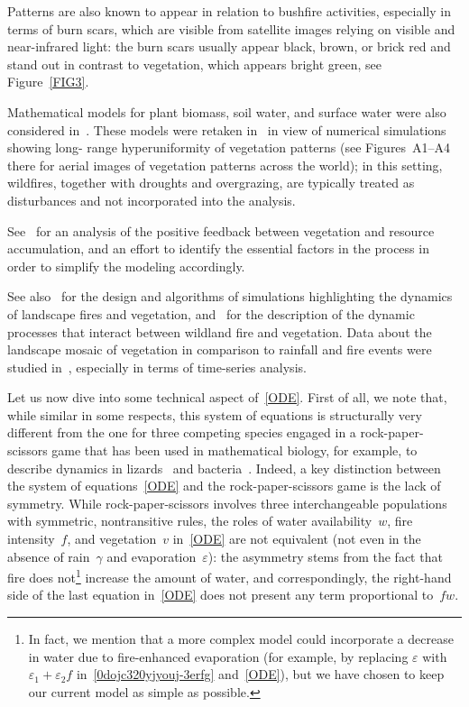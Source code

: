\documentclass[12pt]{amsart}
\renewcommand{\epsilon}{\varepsilon}
\numberwithin{equation}{section}
\begin{document}
Patterns are also known to appear in relation to bushfire activities, especially in terms of burn scars,
which are visible from satellite images relying on
visible and near-infrared light: the burn scars usually appear black, brown, or brick red and stand out in contrast to vegetation, which appears bright green, see Figure~\ref{FIG3}.

Mathematical models for plant biomass, soil water, and surface water were also considered in~\cite{RIET}.
These models were retaken in~\cite{HID}
in view of numerical simulations showing
long- range hyperuniformity of vegetation patterns (see Figures~A1--A4 there for aerial images of
vegetation patterns across the world);
in this setting, wildfires, together with droughts and overgrazing, are typically treated
as disturbances and not incorporated into the analysis.

See~\cite{SCAN, H78} for an analysis of the positive feedback between vegetation and resource accumulation, and an effort to identify the essential factors in the process in order to simplify the modeling accordingly.

See also~\cite{KEANE} for the design and
algorithms of simulations highlighting the dynamics of landscape fires and vegetation,
and~\cite{2015, 2017, 2022}
for the description of the dynamic processes that interact between wildland
fire and vegetation.
Data about the landscape mosaic of vegetation in comparison to rainfall and fire events were studied in~\cite{ETTEN},
especially in terms of time-series analysis.

Let us now dive into some technical aspect
of~\eqref{ODE}. First of all, we note that, while similar in some respects, this system of equations is structurally very different from the one for three competing species engaged in a rock-paper-scissors game that  has been used in mathematical biology, for example, to describe dynamics in lizards~\cite{SIN} and bacteria~\cite{KIR}. Indeed, a key distinction between the system of equations~\eqref{ODE} and the rock-paper-scissors game is the lack of symmetry. While rock-paper-scissors involves three interchangeable populations with symmetric, nontransitive rules, the roles of water availability~$w$, fire intensity~$f$, and vegetation~$v$ in~\eqref{ODE} are not equivalent
(not even in the absence of rain~$\gamma$ and evaporation~$\epsilon$): the asymmetry stems from the fact that fire does not\footnote{In fact, we mention that a more complex model could incorporate a decrease in water due to fire-enhanced evaporation (for example, by replacing $\epsilon$ with $\epsilon_1 + \epsilon_2 f$ in~\eqref{0dojc320yjyouj-3erfg} and~\eqref{ODE}), but we have chosen to keep our current model as simple as possible.}
increase the amount of water,
and correspondingly, the right-hand side of the last equation in~\eqref{ODE}
does not present any term proportional to~$fw$.
\end{document}
